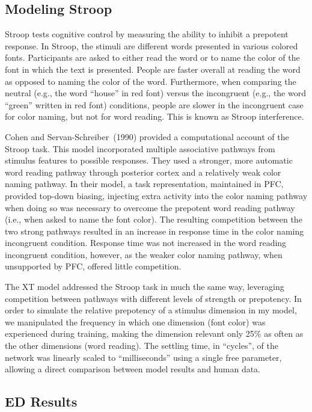 \documentclass[man]{apa}
\begin{document}
\subsection{Modeling Stroop} 

Stroop tests cognitive control by measuring the ability to inhibit a prepotent response.  In Stroop, the stimuli are different words presented in various colored fonts.  Participants are asked to either read the word or to name the color of the font in which the text is presented.  People are faster overall at reading the word as opposed to naming the color of the word.  Furthermore, when comparing the neutral (e.g., the word ``house'' in red font) versus the incongruent (e.g., the word ``green'' written in red font) conditions, people are slower in the incongruent case for color naming, but not for word reading.  This is known as Stroop interference.

Cohen and Servan-Schreiber~(1990)\nocite{CohenJD:1990:Stroop} provided a computational account of the Stroop task. This model incorporated multiple associative pathways from stimulus features to possible responses.  They used a stronger, more automatic word reading pathway through posterior cortex and a relatively weak color naming pathway.  In their model, a task representation, maintained in PFC, provided top-down biasing, injecting extra activity into the color naming pathway when doing so was necessary to overcome the prepotent word reading pathway (i.e., when asked to name the font color).  The resulting competition between the two strong pathways resulted in an increase in response time in the color naming incongruent condition.  Response time was not increased in the word reading incongruent condition, however, as the weaker color naming pathway, when unsupported by PFC, offered little competition.

The XT model addressed the Stroop task in much the same way, leveraging competition between pathways with different levels of strength or prepotency.  In order to simulate the relative prepotency of a stimulus dimension in my model, we manipulated the frequency in which one dimension (font color) was experienced during training, making the dimension relevant only 25\% as often as the other dimensions (word reading).  The settling time, in ``cycles'', of the network was linearly scaled to ``milliseconds'' using a single free parameter, allowing a direct comparison between model results and human data.

\subsection{ED Results} 
\end{document}
